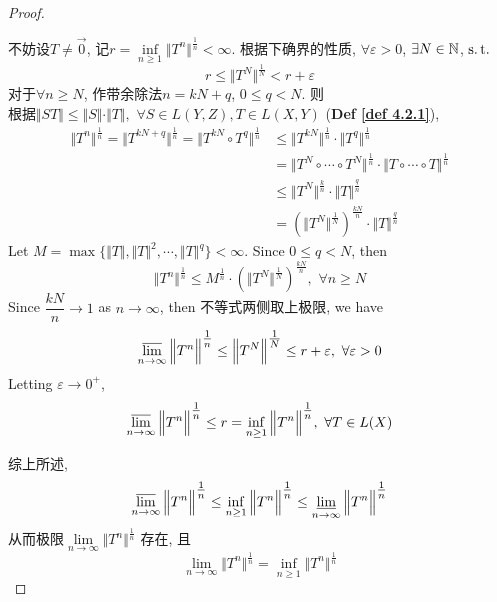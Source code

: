 \begin{thm}
\begin{proof}
\begin{enumerate}
				\vspace*{1em}
				
				不妨设$T \neq \overrightarrow{0}$, 记$r = \underset{n \geq 1}{\inf} \Big\Vert T^n \Big\Vert^{\tfrac{1}{n}} < \infty$. 根据下确界的性质, $\forall \varepsilon > 0$, $\exists N \in \mathbb{N}$, $\operatorname{s.t.}$
				\[ r \leq \Big\Vert T^N \Big\Vert^{\tfrac{1}{N}} < r + \varepsilon \]
				对于$\forall n \geq N$, 作带余除法$n = kN + q$, $0 \leq q < N$. 则 \\
				根据$\Vert ST \Vert \leq \Vert S \Vert \cdot \Vert T \Vert , \,\, \forall S \in L(Y , Z) , T \in L(X , Y)$ (\textbf{Def \ref{def 4.2.1}}), 
				\begin{align*}
					\Big\Vert T^n \Big\Vert^{\tfrac{1}{n}} 
					= \Big\Vert T^{kN + q} \Big\Vert^{\tfrac{1}{n}} 
					= \Big\Vert T^{kN} \circ T^q \Big\Vert^{\tfrac{1}{n}} 
					&\leq \Big\Vert T^{kN} \Big\Vert^{\tfrac{1}{n}} \cdot \Big\Vert T^q \Big\Vert^{\tfrac{1}{n}} \\
					&= \Big\Vert T^N \circ \cdots \circ T^N \Big\Vert^{\tfrac{1}{n}} \cdot \Big\Vert T \circ \cdots \circ T \Big\Vert^{\tfrac{1}{n}} \\
					&\leq \Big\Vert T^N \Big\Vert^{\tfrac{k}{n}} \cdot \Big\Vert T \Big\Vert^{\tfrac{q}{n}} \\
					&= \left( \Big\Vert T^N \Big\Vert^{\tfrac{1}{N}} \right)^{\tfrac{kN}{n}} \cdot \Big\Vert T \Big\Vert^{\tfrac{q}{n}}
				\end{align*}
				Let $M = \max \Big\{ \Vert T \Vert , \Vert T \Vert^2 , \cdots , \Vert T \Vert^q \Big\} < \infty$. Since $0 \leq q < N$, then 
				\[ \Big\Vert T^n \Big\Vert^{\tfrac{1}{n}} \leq M^{\tfrac{1}{n}} \cdot \left( \Big\Vert T^N \Big\Vert^{\tfrac{1}{N}} \right)^{\tfrac{kN}{n}} , \,\, \forall n \geq N \]
				Since $\dfrac{kN}{n} \to 1$ as $n \to \infty$, then 不等式两侧取上极限, we have
				\[ \varlimsup_{n \to \infty} \Big\Vert T^n \Big\Vert^{\tfrac{1}{n}} \leq \Big\Vert T^N \Big\Vert^{\tfrac{1}{N}} \leq r + \varepsilon , \,\, \forall \varepsilon > 0 \]
				Letting $\varepsilon \to 0^+$, 
				\[ \varlimsup_{n \to \infty} \Big\Vert T^n \Big\Vert^{\tfrac{1}{n}} \leq r = \inf_{n \geq 1} \Big\Vert T^n \Big\Vert^{\tfrac{1}{n}} , \,\, \forall T \in L(X) \]
			\end{enumerate}
			
			\vspace*{4em}
			
			\hspace*{-1.95em}综上所述, 
			\[ \varlimsup_{n \to \infty} \Big\Vert T^n \Big\Vert^{\tfrac{1}{n}} 
			\leq \inf_{n \geq 1} \Big\Vert T^n \Big\Vert^{\tfrac{1}{n}} 
			\leq \varliminf_{n \to \infty} \Big\Vert T^n \Big\Vert^{\tfrac{1}{n}} \]
			从而极限$\underset{n \to \infty}{\lim} \Big\Vert T^n \Big\Vert^{\tfrac{1}{n}}$ 存在, 且
			\[ \lim_{n \to \infty} \Big\Vert T^n \Big\Vert^{\tfrac{1}{n}} = \inf_{n \geq 1} \Big\Vert T^n \Big\Vert^{\tfrac{1}{n}} \]
		\end{proof}
	\end{thm}

